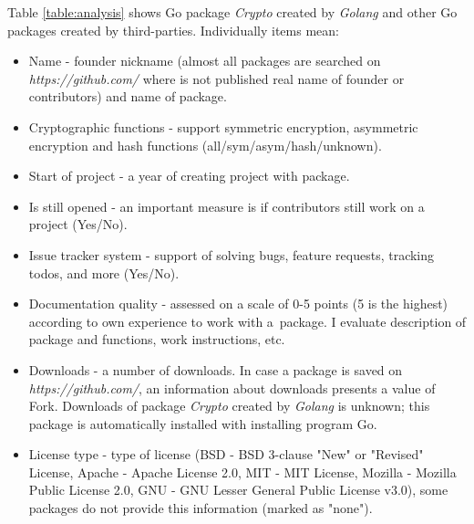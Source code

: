 \documentclass[
  oneside, 12pt, 
  printed, %
  notable,   %
  nolof,     %
  nolot,     %
]{fithesis3}
\begin{document}
Table \ref{table:analysis} shows Go package \textit{Crypto} created by \textit{Golang} and other Go packages created by third-parties. Individually items mean:
\begin{itemize}[leftmargin=2em,rightmargin=1em,itemsep=0.75\parskip,parsep=0em,topsep=0em,partopsep=0em]
\item Name - founder nickname (almost all packages are searched on \textit{https://github.com/} where is not published real name of founder or contributors) and name of package.
\item Cryptographic functions - support symmetric encryption, asymmetric encryption and hash functions (all/sym/asym/hash/unknown).
\item Start of project - a year of creating project with package.
\item Is still opened - an important measure is if contributors still work on a project (Yes/No).
\item Issue tracker system - support of solving bugs, feature requests, tracking todos, and more (Yes/No).
\item Documentation quality - assessed on a scale of 0-5 points (5 is the highest) according to own experience to work with a~package. I evaluate description of package and functions, work instructions, etc.
\item Downloads - a number of downloads. In case a package is saved on \textit{https://github.com/}, an information about downloads presents a value of Fork. Downloads of package \textit{Crypto} created by \textit{Golang} is unknown; this package is automatically installed with installing program Go.  
\item License type - type of license (BSD - BSD 3-clause "New" or "Revised" License, Apache - Apache License 2.0, MIT - MIT License, Mozilla - Mozilla Public License 2.0, GNU - GNU Lesser General Public License v3.0), some packages do not provide this information (marked as "none").
\end{itemize}
\end{document}
